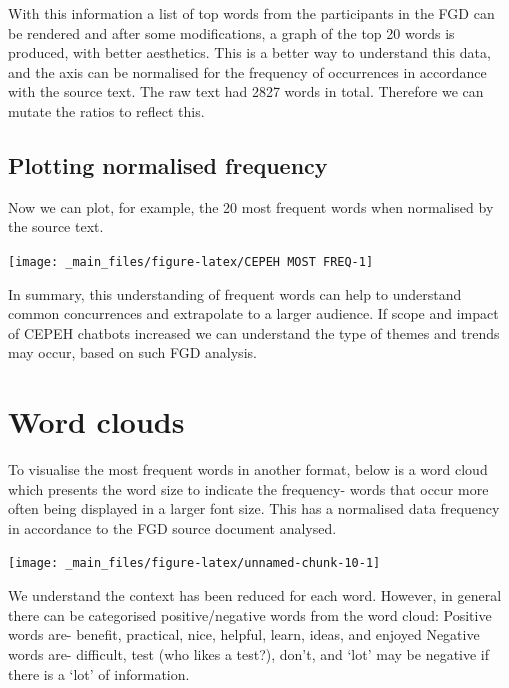 \documentclass[a4paper, nobind]{templates/ociamthesis}
\begin{document}
With this information a list of top words from the participants in the
FGD can be rendered and after some modifications, a graph of the top 20
words is produced, with better aesthetics. This is a better way to
understand this data, and the axis can be normalised for the frequency
of occurrences in accordance with the source text. The raw text had 2827
words in total. Therefore we can mutate the ratios to reflect this.

\hypertarget{plotting-normalised-frequency}{%
\subsection{Plotting normalised frequency}\label{plotting-normalised-frequency}}

Now we can plot, for example, the 20 most frequent words when normalised
by the source text.

\begin{center}\texttt{[image: \_main\_files/figure-latex/CEPEH MOST FREQ-1]} \end{center}

In summary, this understanding of frequent words can help to understand
common concurrences and extrapolate to a larger audience. If scope and
impact of CEPEH chatbots increased we can understand the type of themes
and trends may occur, based on such FGD analysis.

\hypertarget{word-clouds}{%
\section{Word clouds}\label{word-clouds}}

To visualise the most frequent words in another format, below is a word
cloud which presents the word size to indicate the frequency- words that
occur more often being displayed in a larger font size. This has a
normalised data frequency in accordance to the FGD source document
analysed.

\begin{center}\texttt{[image: \_main\_files/figure-latex/unnamed-chunk-10-1]} \end{center}

We understand the context has been reduced for each word. However, in
general there can be categorised positive/negative words from the word
cloud: Positive words are- benefit, practical, nice, helpful, learn,
ideas, and enjoyed Negative words are- difficult, test (who likes a
test?), don't, and `lot' may be negative if there is a `lot' of
information.
\end{document}
